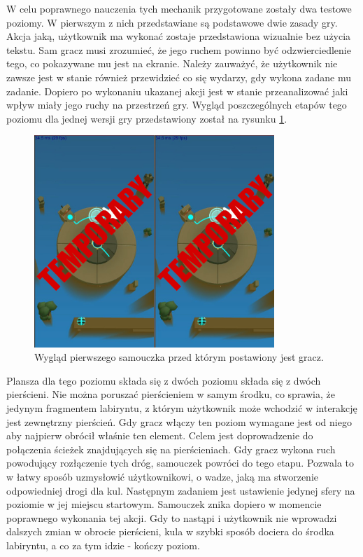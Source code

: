 \documentclass[a4paper,12pt,numbers=noenddot]{report}
\begin{document}
W celu poprawnego nauczenia tych mechanik przygotowane zostały dwa testowe poziomy. W pierwszym z nich przedstawiane są podstawowe dwie zasady gry. Akcja jaką, użytkownik ma wykonać zostaje przedstawiona wizualnie bez użycia tekstu. Sam gracz musi zrozumieć, że jego ruchem powinno być odzwierciedlenie tego, co pokazywane mu jest na ekranie. Należy zauważyć, że użytkownik nie zawsze jest w stanie również przewidzieć co się wydarzy, gdy wykona zadane mu zadanie. Dopiero po wykonaniu ukazanej akcji jest w stanie przeanalizować jaki wpływ miały jego ruchy na przestrzeń gry.
Wygląd poszczególnych etapów tego poziomu dla jednej wersji gry przedstawiony został na rysunku \ref{fig:tut_L1_1}.

\begin{figure}[h!]
	\centering
  	\includegraphics[height=8cm]{fig/tmp2.jpg}
	\caption{Wygląd pierwszego samouczka przed którym postawiony jest gracz.}
	\label{fig:tut_L1_1}
\end{figure}

Plansza dla tego poziomu składa się z dwóch poziomu składa się z dwóch pierścieni. Nie można poruszać pierścieniem w samym środku, co sprawia, że jedynym fragmentem labiryntu, z którym użytkownik może wchodzić w interakcję jest zewnętrzny pierścień.
Gdy gracz włączy ten poziom wymagane jest od niego aby najpierw obrócił właśnie ten element. Celem jest doprowadzenie do połączenia ścieżek znajdujących się na pierścieniach. Gdy gracz wykona ruch powodujący rozłączenie tych dróg, samouczek powróci do tego etapu. Pozwala to w łatwy sposób uzmysłowić użytkownikowi, o wadze, jaką ma stworzenie odpowiedniej drogi dla kul. 
Następnym zadaniem jest ustawienie jedynej sfery na poziomie w jej miejscu startowym. Samouczek znika dopiero w momencie poprawnego wykonania tej akcji. Gdy to nastąpi i użytkownik nie wprowadzi dalszych zmian w obrocie pierścieni, kula w szybki sposób dociera do środka labiryntu, a co za tym idzie - kończy poziom.
\end{document}

